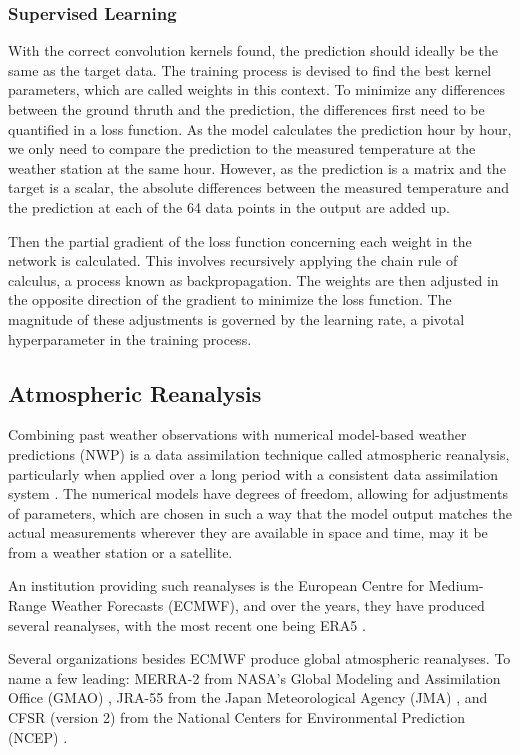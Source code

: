 \subsubsection*{Supervised Learning}

With the correct convolution kernels found, the prediction should ideally be the same as the target data.
The training process is devised to find the best kernel parameters, which are called weights in this context.
To minimize any differences between the ground thruth and the prediction, the differences first need to be quantified in a loss function.
As the model calculates the prediction hour by hour, we only need to compare the prediction to the measured temperature at the weather station at the same hour.
However, as the prediction is a matrix and the target is a scalar, the absolute differences between the measured temperature and the prediction at each of the 64 data points in the output are added up. 

Then the partial gradient of the loss function concerning each weight in the network is calculated.
This involves recursively applying the chain rule of calculus, a process known as backpropagation. The weights are then adjusted in the opposite direction of the gradient to minimize the loss function.
The magnitude of these adjustments is governed by the learning rate, a pivotal hyperparameter in the training process. 

\subsection{Atmospheric Reanalysis}
 
Combining past weather observations with numerical model-based weather predictions (NWP)
is a data assimilation technique called atmospheric reanalysis, particularly when applied over a long period with a consistent data assimilation system \cite{Poli2016ERA20C, ECMWF2020dataassimilation}. The numerical models have degrees of freedom, allowing for adjustments of parameters, which are chosen in such a way that the model output matches the actual measurements wherever they are available in space and time, may it be from a weather station or a satellite.

An institution providing such reanalyses is the European Centre for Medium-Range Weather Forecasts (ECMWF), and over the years, they have produced several reanalyses, with the most recent one being ERA5 \cite{Hersbach2020ERA5quality}.

Several organizations besides ECMWF produce global atmospheric reanalyses. To name a few leading: MERRA-2 from NASA's Global Modeling and Assimilation Office (GMAO) \cite{Gelaro2017}, JRA-55 from the Japan Meteorological Agency (JMA) \cite{Kobayashi2015}, and CFSR (version 2) from the National Centers for Environmental Prediction (NCEP) \cite{Saha2014}.

